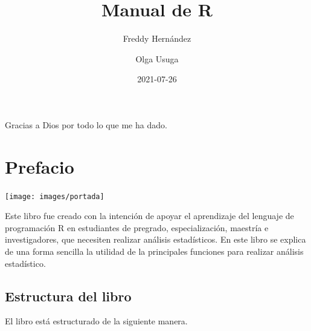 \documentclass[
]{book}
\title{Manual de R}
\author{Freddy Hernández \and Olga Usuga}
\date{2021-07-26}
\begin{document}
\maketitle


\thispagestyle{empty}

\begin{center}

Gracias a Dios por todo lo que me ha dado.

\end{center}

\setlength{\abovedisplayskip}{-5pt}
\setlength{\abovedisplayshortskip}{-5pt}

{
\setcounter{tocdepth}{1}
\tableofcontents
}
\hypertarget{prefacio}{%
\chapter*{Prefacio}\label{prefacio}}

\begin{center}\texttt{[image: images/portada]} \end{center}

Este libro fue creado con la intención de apoyar el aprendizaje del lenguaje de programación R en estudiantes de pregrado, especialización, maestría e investigadores, que necesiten realizar análisis estadísticos. En este libro se explica de una forma sencilla la utilidad de la principales funciones para realizar análisis estadístico.

\hypertarget{estructura-del-libro}{%
\section*{Estructura del libro}\label{estructura-del-libro}}

El libro está estructurado de la siguiente manera.
\end{document}
